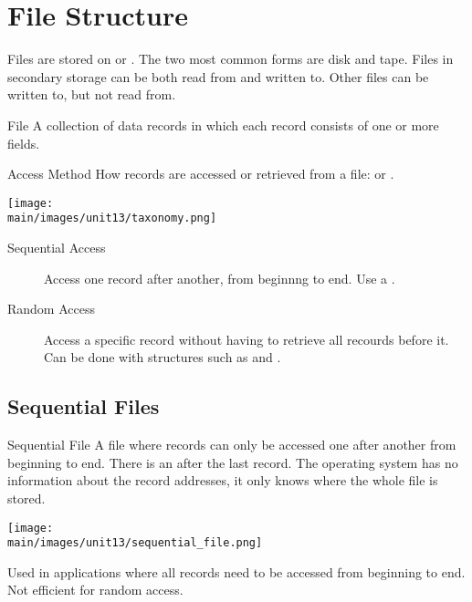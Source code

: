 \documentclass[\main/notes.tex]{subfiles}
\begin{document}
	\setcounter{chapter}{12}
	\chapter{File Structure}
		Files are stored on  or . The two most common forms are disk and tape. Files in secondary storage can be both read from and written to. Other files can be written to, but not read from.
		\begin{definition}{File}
			A collection of data records in which each record consists of one or more fields.
		\end{definition}
		\begin{definition}{Access Method}
			How records are accessed or retrieved from a file:  or .
			\begin{center}
				\texttt{[image: \\main/images/unit13/taxonomy.png]}
			\end{center}
			\begin{description}
				\item[Sequential Access] Access one record after another, from beginnng to end. Use a .
				\item[Random Access] Access a specific record without having to retrieve all recourds before it. Can be done with structures such as  and .
			\end{description}
		\end{definition}
		\pagebreak
		\section{Sequential Files}
			\begin{definition}{Sequential File}
				A file where records can only be accessed one after another from beginning to end. There is an  after the last record. The operating system has no information about the record addresses, it only knows where the whole file is stored.
				\begin{center}
					\texttt{[image: \\main/images/unit13/sequential\_file.png]}
				\end{center}
			\end{definition}
			Used in applications where all records need to be accessed from beginning to end. Not efficient for random access.
\end{document}
